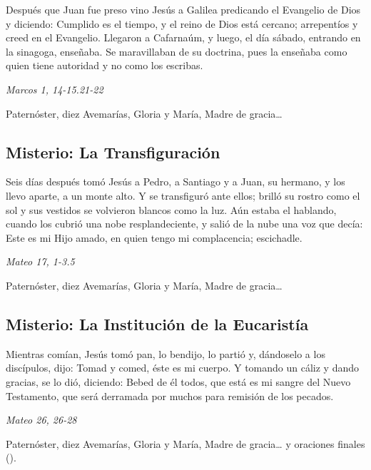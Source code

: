 \documentclass[./rosary.tex]{subfiles}
\newcounter{lux-counter}
\begin{document}
Después que Juan fue preso vino Jesús a Galilea predicando el Evangelio de Dios y diciendo: Cumplido es el tiempo, y el reino de Dios está cercano; arrepentíos y creed en el Evangelio. Llegaron a Cafarnaúm, y luego, el día sábado, entrando en la sinagoga, enseñaba. Se maravillaban de su doctrina, pues la enseñaba como quien tiene autoridad y no como los escribas.

\begin{flushright}
      \emph{Marcos 1, 14-15.21-22}
\end{flushright}

Paternóster, diez Avemarías, Gloria y María, Madre de gracia{\ldots}

\bigskip

\subsection*{ Misterio: La Transfiguración}

Seis días después tomó Jesús a Pedro, a Santiago y a Juan, su hermano, y los llevo aparte, a un monte alto. Y se transfiguró ante ellos; brilló su rostro como el sol y sus vestidos se volvieron blancos como la luz. Aún estaba el hablando, cuando los cubrió una nobe resplandeciente, y salió de la nube una voz que decía: Este es mi Hijo amado, en quien tengo mi complacencia; escichadle.

\begin{flushright}
      \emph{Mateo 17, 1-3.5}
\end{flushright}

Paternóster, diez Avemarías, Gloria y María, Madre de gracia{\ldots}

\bigskip

\subsection*{ Misterio: La Institución de la Eucaristía}

Mientras comían, Jesús tomó pan, lo bendijo, lo partió y, dándoselo a los discípulos, dijo: Tomad y comed, éste es mi cuerpo. Y tomando un cáliz y dando gracias, se lo dió, diciendo: Bebed de él todos, que está es mi sangre del Nuevo Testamento, que será derramada por muchos para remisión de los pecados.

\begin{flushright}
      \emph{Mateo 26, 26-28}
\end{flushright}

Paternóster, diez Avemarías, Gloria y María, Madre de gracia{\ldots} y oraciones finales ().
\end{document}
